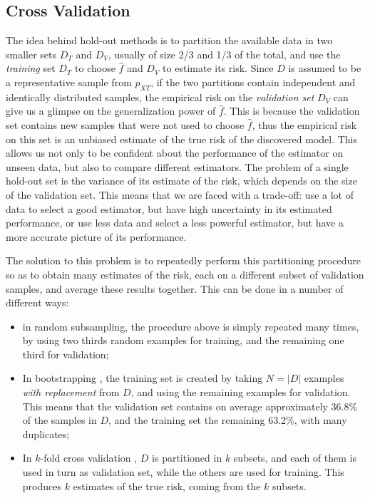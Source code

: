\documentclass[a4paper,11pt]{kth-mag}
\begin{document}
\subsection{Cross Validation}
\label{sec:cv}
The idea behind hold-out methods is to partition the available data in two smaller sets $D_T$ and $D_V$, usually of size 2/3 and 1/3 of the total, and use the \emph{training} set $D_T$ to choose $\hat{f}$ and $D_V$ to estimate its risk. Since $D$ is assumed to be a representative sample from $p_{XT}$, if the two partitions contain independent and identically distributed samples, the empirical risk on the \emph{validation set} $D_V$ can give us a glimpse on the generalization power of $\hat{f}$. This is because the validation set contains new samples that were not used to choose $\hat{f}$, thus the empirical risk on this set is an unbiased estimate of the true risk of the discovered model. This allows us not only to be confident about the performance of the estimator on unseen data, but also to compare different estimators. The problem of a single hold-out set is the variance of its estimate of the risk, which depends on the size of the validation set. This means that we are faced with a trade-off: use a lot of data to select a good estimator, but have high uncertainty in its estimated performance, or use less data and select a less powerful estimator, but have a more accurate picture of its performance.

The solution to this problem is to repeatedly perform this partitioning procedure so as to obtain many estimates of the risk, each on a different subset of validation samples, and average these results together. This can be done in a number of different ways:

\begin{itemize}
\item in random subsampling, the procedure above is simply repeated many times, by using two thirds random examples for training, and the remaining one third for validation;
\item In bootstrapping \citep{bootstrap}, the training set is created by taking $N=\vert D\vert$ examples \emph{with replacement} from $D$, and using the remaining examples for validation. This means that the validation set contains on average approximately 36.8\% of the samples in $D$, and the training set the remaining 63.2\%, with many duplicates;
\item In $k$-fold cross validation \citep{kfold}, $D$ is partitioned in $k$ subsets, and each of them is used in turn as validation set, while the others are used for training. This produces $k$ estimates of the true risk, coming from the $k$ subsets.
\end{itemize}
\end{document}

